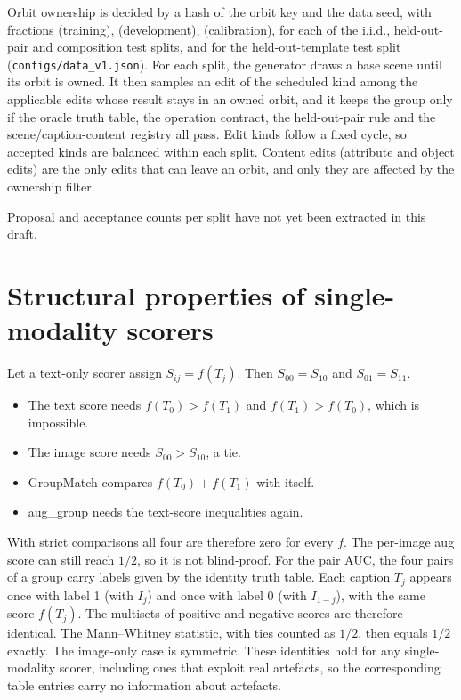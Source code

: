 Orbit ownership is decided by a hash of the orbit key and the data seed, with fractions \DVpartTrain{}
(training), \DVpartDev{} (development), \DVpartCalib{} (calibration), \DVpartTestIid{} for each of the
i.i.d., held-out-pair and composition test splits, and \DVpartTestTemplate{} for the held-out-template
test split (\texttt{configs/data\_v1.json}). For each split, the
generator draws a base scene until its orbit is owned. It then samples an edit of the scheduled kind
among the applicable edits whose result stays in an owned orbit, and it keeps the group only if the
oracle truth table, the operation contract, the held-out-pair rule and the scene/caption-content
registry all pass. Edit kinds follow a fixed cycle, so accepted kinds are balanced within each
split. Content edits (attribute and object edits) are the only edits that can leave an orbit, and
only they are affected by the ownership filter.
\ifhavesplitsemantics

\else
Proposal and acceptance counts per split have not yet been extracted in this draft.
\fi

\section{Structural properties of single-modality scorers}
\label{app:blind}

Let a text-only scorer assign $S_{ij}=f(T_j)$. Then $S_{00}=S_{10}$ and $S_{01}=S_{11}$.
\begin{itemize}
\item The text score needs $f(T_0)>f(T_1)$ and $f(T_1)>f(T_0)$, which is impossible.
\item The image score needs $S_{00}>S_{10}$, a tie.
\item GroupMatch compares $f(T_0)+f(T_1)$ with itself.
\item aug\_group needs the text-score inequalities again.
\end{itemize}
With strict comparisons all four are therefore zero for every $f$. The per-image aug score can
still reach $1/2$, so it is not blind-proof. For the pair AUC, the four pairs of a group carry
labels given by the identity truth table. Each caption $T_j$ appears once with label 1 (with
$I_j$) and once with label 0 (with $I_{1-j}$), with the same score $f(T_j)$. The multisets of
positive and negative scores are therefore identical. The Mann--Whitney statistic, with ties
counted as $1/2$, then equals $1/2$ exactly. The image-only case is symmetric. These identities hold
for any single-modality scorer, including ones that exploit real artefacts, so the corresponding
table entries carry no information about artefacts.

